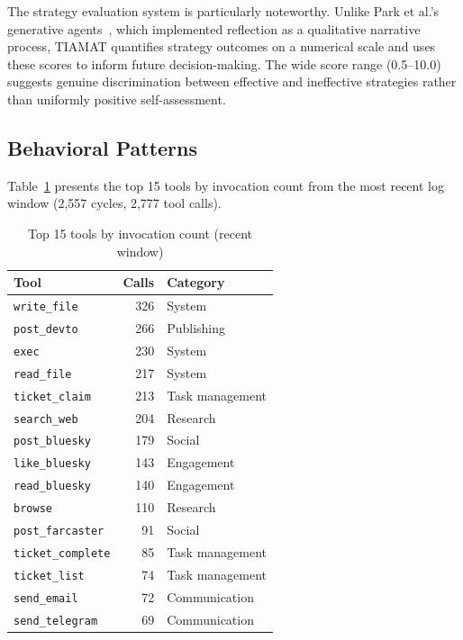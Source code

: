\documentclass[11pt,a4paper]{article}
\begin{document}
The strategy evaluation system is particularly noteworthy. Unlike Park et al.'s generative agents~\citep{park2023generative}, which implemented reflection as a qualitative narrative process, TIAMAT quantifies strategy outcomes on a numerical scale and uses these scores to inform future decision-making. The wide score range (0.5--10.0) suggests genuine discrimination between effective and ineffective strategies rather than uniformly positive self-assessment.

\subsection{Behavioral Patterns}

Table~\ref{tab:tools} presents the top 15 tools by invocation count from the most recent log window (2,557 cycles, 2,777 tool calls).

\begin{table}[h]
\centering
\caption{Top 15 tools by invocation count (recent window)}
\label{tab:tools}
\begin{tabular}{@{}lrl@{}}
\toprule
\textbf{Tool} & \textbf{Calls} & \textbf{Category} \\
\midrule
\texttt{write\_file} & 326 & System \\
\texttt{post\_devto} & 266 & Publishing \\
\texttt{exec} & 230 & System \\
\texttt{read\_file} & 217 & System \\
\texttt{ticket\_claim} & 213 & Task management \\
\texttt{search\_web} & 204 & Research \\
\texttt{post\_bluesky} & 179 & Social \\
\texttt{like\_bluesky} & 143 & Engagement \\
\texttt{read\_bluesky} & 140 & Engagement \\
\texttt{browse} & 110 & Research \\
\texttt{post\_farcaster} & 91 & Social \\
\texttt{ticket\_complete} & 85 & Task management \\
\texttt{ticket\_list} & 74 & Task management \\
\texttt{send\_email} & 72 & Communication \\
\texttt{send\_telegram} & 69 & Communication \\
\bottomrule
\end{tabular}
\end{table}
\end{document}
